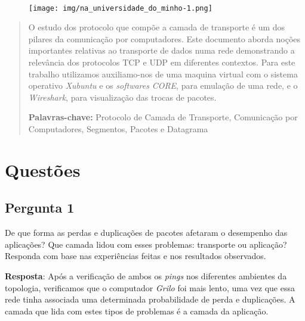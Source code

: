 \documentclass[runningheads]{llncs}
\begin{document}
\paragraph{}

\begin{figure}[ht]
\centering
\texttt{[image: img/na\_universidade\_do\_minho-1.png]} 
\end{figure} 

\setcounter{tocdepth}{2}
\makeatletter
\renewcommand*\l@author[2]{}
\renewcommand*\l@title[2]{}
\makeatletter
        
\newpage
\renewcommand{\contentsname}{Índice}
\tableofcontents
\printindex

\pagebreak

%
\renewcommand{\abstractname}{\textbf{Resumo:}}
\renewcommand{\keywords}{\textbf{Palavras-chave: }}
\begin{abstract}
O estudo dos protocolo que compõe a camada de transporte é um dos pilares da comunicação por computadores. Este documento aborda noções importantes relativas ao transporte de dados numa rede demonstrando a relevância dos protocolos TCP e UDP em diferentes contextos.
Para este trabalho utilizamos auxiliamo-nos de uma maquina virtual com o sistema operativo \textit{Xubuntu} e os \textit{softwares} \textit{CORE}, para emulação de uma rede, e o \textit{Wireshark}, para visualização das trocas de pacotes.

\keywords{Protocolo de Camada de Transporte,  Comunicação por Computadores, Segmentos, Pacotes e Datagrama}
\end{abstract}

\section{Questões}
    \subsection{Pergunta 1}
    De que forma as perdas e duplicações de pacotes afetaram o desempenho das aplicações? Que camada lidou com esses problemas: transporte ou aplicação? Responda com base nas experiências feitas e nos resultados observados.
    
    \bigskip
    
    \textbf{Resposta}: Após a verificação de ambos os \textit{pings} nos diferentes ambientes da topologia, verificamos que o computador \textit{Grilo} foi mais lento, uma vez que essa rede tinha associada uma determinada probabilidade de perda e duplicações. 
    A camada que lida com estes tipos de problemas é a camada da aplicação.
    
\end{document}
